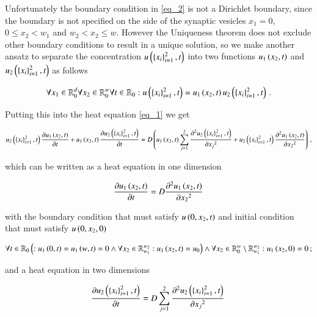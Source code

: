 \documentclass[11pt,english,a4paper]{article}
\begin{document}
\begin{flushleft}
Unfortunately the boundary condition in \eqref{eq_2} is not a Dirichlet boundary, since the boundary is not specified on the side of the synaptic vesicles $x_1=0$, $0\leq x_2 < w_1$ and $w_2 < x_2 \leq w$. However the Uniqueness theorem does not exclude other boundary conditions to result in a unique solution, so we make another ansatz to separate the concentration $u\left({\left\lbrace{x_i}\right\rbrace_{i=1}^2,t}\right)$ into two functions $u_1\left({x_2,t}\right)$ and $u_2\left({\left\lbrace{x_i}\right\rbrace_{i=1}^2,t}\right)$ as follows

\begin{align}
\forall x_1 \in \mathbb{R}_0^d \forall x_2 \in \mathbb{R}_0^w \forall t \in \mathbb{R}_{0}: u\left({\left\lbrace{x_i}\right\rbrace_{i=1}^2,t}\right) = u_1\left({x_2,t}\right) u_2\left({\left\lbrace{x_i}\right\rbrace_{i=1}^2,t}\right) \,.
\label{eq_3}
\end{align}

Putting this into the heat equation \eqref{eq_1} we get

\begin{align*}
u_2\left({\left\lbrace{x_i}\right\rbrace_{i=1}^2,t}\right)\frac{\partial u_1\left({x_2,t}\right)}{\partial t} + u_1\left({x_2,t}\right)\frac{\partial u_2\left({\left\lbrace{x_i}\right\rbrace_{i=1}^2,t}\right)}{\partial t} = D\left({u_1\left({x_2,t}\right)\sum_{j=1}^2\frac{\partial^2 u_2\left({\left\lbrace{x_i}\right\rbrace_{i=1}^2,t}\right)}{\partial {x_j}^2} + u_2\left({\left\lbrace{x_i}\right\rbrace_{i=1}^2,t}\right)\frac{\partial^2 u_1\left({x_2,t}\right)}{\partial {x_2}^2}}\right) \,,
\end{align*}

which can be written as a heat equation in one dimension

\begin{align}
\frac{\partial u_1\left({x_2,t}\right)}{\partial t}  = D \frac{\partial^2 u_1\left({x_2,t}\right)}{\partial {x_2}^2}
\label{eq_4}
\end{align}

with the boundary condition that must satisfy $u\left({0,x_2,t}\right)$ and initial condition that must satisfy $u\left({0,x_2,0}\right)$

\begin{align}
\forall t \in \mathbb{R}_0 \left({: u_1\left({0,t}\right) = u_1\left({w,t}\right) = 0 \wedge \forall x_2\in\mathbb{R}_{w_1}^{w_2}: u_1\left({x_2,t}\right) = u_0}\right) \wedge \forall x_2 \in\mathbb{R}_{0}^{w} \setminus \mathbb{R}_{w_1}^{w_2}: u_1\left({x_2,0}\right) = 0\,;
\label{eq_5}
\end{align}

and a heat equation in two dimensions

\begin{align}
\frac{\partial u_2\left({\left\lbrace{x_i}\right\rbrace_{i=1}^2,t}\right)}{\partial t} = D\sum_{j=1}^2\frac{\partial^2 u_2\left({\left\lbrace{x_i}\right\rbrace_{i=1}^2,t}\right)}{\partial {x_j}^2} \
\label{eq_6}
\end{align}


\end{flushleft}
\end{document}
